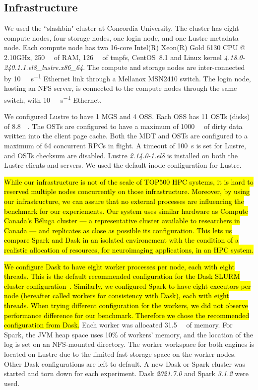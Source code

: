 \documentclass[AMA,STIX1COL]{WileyNJD-v2}
\newcommand{\HL}[1]{\hl{#1}}
\begin{document}
\subsection{Infrastructure}
We used the ``slashbin" cluster at Concordia University.
The cluster has eight compute nodes, four storage nodes, one login node, and one Lustre metadata node.
Each compute node has two 16-core Intel(R) Xeon(R) Gold 6130 CPU @ 2.10GHz,
\SI{250}{\gibi\byte} of RAM, \SI{126}{\gibi\byte} of tmpfs,
CentOS~8.1 and Linux kernel \textit{4.18.0-240.1.1.el8\_lustre.x86\_64}.
The compute and storage nodes are inter-connected by {\SI{10}{\giga\bit\per\second}} Ethernet link through a Mellanox MSN2410 switch.
The login node, hosting an NFS server, is connected to the compute nodes through the same switch, with {\SI{10}{\giga\bit\per\second}} Ethernet.
				
We configured Lustre to have 1 MGS and 4 OSS.
Each OSS has 11 OSTs (disks) of \SI{8.8}{\tebi\byte}.
The OSTs are configured to have a maximum of \SI{1000}{\mebi\byte} of dirty data written into the client page cache.
Both the MDT and OSTs are configured to a maximum of 64 concurrent RPCs in flight.
A timeout of \SI{100}{\second} is set for Lustre, and OSTs checksum are disabled.
Lustre \textit{2.14.0-1.el8} is installed on both the Lustre clients and servers.
We used the default inode configuration for Lustre.

\HL{
	While our infrastructure is not of the scale of TOP500 HPC systems,
	it is hard to reserved multiple nodes concurrently on those infrastructure.
	Moreover, by using our infrastructure, we can assure that no external processes
	are influencing the benchmark for our experiements.
	Our system uses similar hardware as Compute Canada's B\'eluga cluster
	--- a representative cluster available to researchers in Canada --- and 
	replicates as close as possible its configuration.
	This lets us compare Spark and Dask in an isolated environement with the condition 
	of a realistic  allocation of resources, for neuroimaging applications, in an HPC system.
}
					
\HL{
	We configure Dask to have eight worker processes per node, each with eight threads.
	This is the default recommended configuration for the Dask SLURM cluster configuration~{\cite{DaskSLURMDoc}}.
	Similarly, we configured Spark to have eight executors per node (hereafter called workers for consistency with Dask), each with eight threads.
	When trying different configuration for the workers, we did not observe performance difference
	for our benchmark.
	Therefore we chose the recommended configuration from Dask.
}
Each worker was allocated \SI{31.5}{\gibi\byte} of memory.
For Spark, the JVM heap space uses 10\% of workers' memory, and the location of the log is set on an NFS-mounted directory.
The worker workspace for both engines is located on Lustre due to the limited fast storage space on the worker nodes.
Other Dask configurations are left to default.
A new Dask or Spark cluster was started and torn down for each experiment.
Dask \textit{2021.7.0} and Spark \textit{3.1.2} were used.
						
\end{document}
